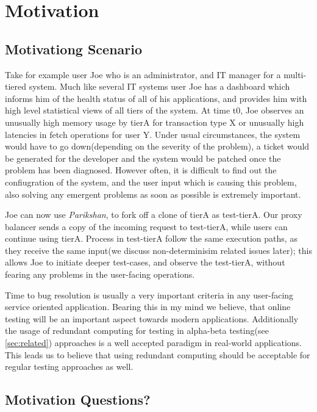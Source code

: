 
\section{Motivation}

\subsection{Motivationg Scenario}

Take for example user Joe who is an administrator, and IT manager for a multi-tiered system. 
Much like several IT systems user Joe has a dashboard which informs him of the health status of all of his applications, and provides him with high level statistical views of all tiers of the system.
At time t0, Joe observes an unusually high memory usage by tierA for transaction type X or unusually high latencies in fetch operations for user Y.
Under usual circumstances, the system would have to go down(depending on the severity of the problem), a ticket would be generated for the developer and the system would be patched once the problem has been diagnosed.
However often, it is difficult to find out the confiugration of the system, and the user input which is causing this problem, also solving any emergent problems as soon as possible is extremely important.

Joe can now use \textit{Parikshan}, to fork off a clone of tierA as test-tierA. Our proxy balancer sends a copy of the incoming request to test-tierA, while users can continue using tierA. 
Process in test-tierA follow the same execution paths, as they receive the same input(we discuss non-determinisim related issues later); this allows Joe to initiate deeper test-cases, and observe the test-tierA, without fearing any problems in the user-facing operations.

Time to bug resolution is usually a very important criteria in any user-facing service oriented application.
Bearing this in my mind we believe, that online testing will be an important aspect towards modern applications.
Additionally the usage of redundant computing for testing in alpha-beta testing(see \ref{sec:related}) approaches is a well accepted paradigm in real-world applications.
This leads us to believe that using redundant computing should be acceptable for regular testing approaches as well.

\subsection{Motivation Questions?}

